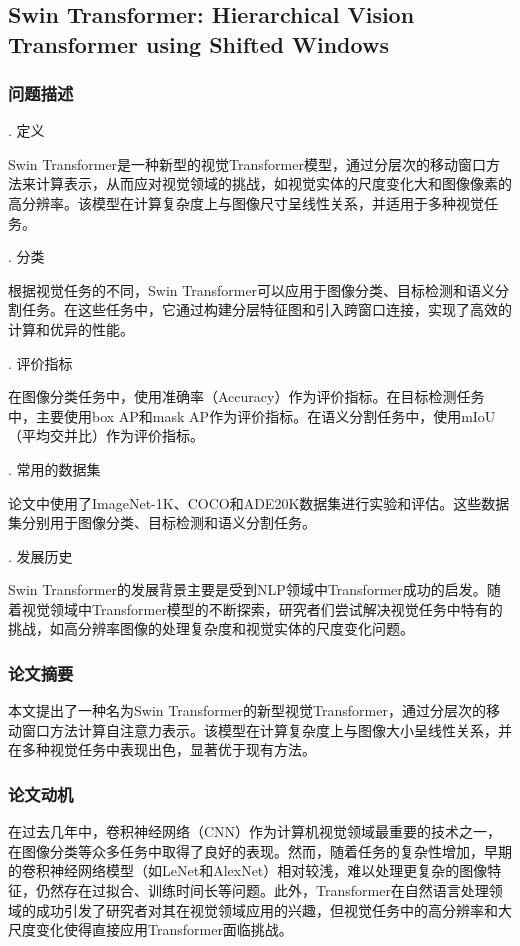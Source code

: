 \documentclass{article}
\begin{document}
\section{}
\subsection{Swin Transformer: Hierarchical Vision Transformer using Shifted Windows}
\subsubsection{问题描述}
. 定义

Swin Transformer是一种新型的视觉Transformer模型，通过分层次的移动窗口方法来计算表示，从而应对视觉领域的挑战，如视觉实体的尺度变化大和图像像素的高分辨率。该模型在计算复杂度上与图像尺寸呈线性关系，并适用于多种视觉任务。

. 分类

根据视觉任务的不同，Swin Transformer可以应用于图像分类、目标检测和语义分割任务。在这些任务中，它通过构建分层特征图和引入跨窗口连接，实现了高效的计算和优异的性能。

. 评价指标

在图像分类任务中，使用准确率（Accuracy）作为评价指标。在目标检测任务中，主要使用box AP和mask AP作为评价指标。在语义分割任务中，使用mIoU（平均交并比）作为评价指标。

. 常用的数据集

论文中使用了ImageNet-1K、COCO和ADE20K数据集进行实验和评估。这些数据集分别用于图像分类、目标检测和语义分割任务。

. 发展历史

Swin Transformer的发展背景主要是受到NLP领域中Transformer成功的启发。随着视觉领域中Transformer模型的不断探索，研究者们尝试解决视觉任务中特有的挑战，如高分辨率图像的处理复杂度和视觉实体的尺度变化问题。

\subsubsection{论文摘要}
本文提出了一种名为Swin Transformer的新型视觉Transformer，通过分层次的移动窗口方法计算自注意力表示。该模型在计算复杂度上与图像大小呈线性关系，并在多种视觉任务中表现出色，显著优于现有方法。

\subsubsection{论文动机}
在过去几年中，卷积神经网络（CNN）作为计算机视觉领域最重要的技术之一，在图像分类等众多任务中取得了良好的表现。然而，随着任务的复杂性增加，早期的卷积神经网络模型（如LeNet和AlexNet）相对较浅，难以处理更复杂的图像特征，仍然存在过拟合、训练时间长等问题。此外，Transformer在自然语言处理领域的成功引发了研究者对其在视觉领域应用的兴趣，但视觉任务中的高分辨率和大尺度变化使得直接应用Transformer面临挑战。
\end{document}
